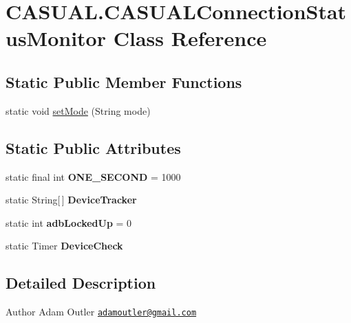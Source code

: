 \hypertarget{classCASUAL_1_1CASUALConnectionStatusMonitor}{\section{C\-A\-S\-U\-A\-L.\-C\-A\-S\-U\-A\-L\-Connection\-Status\-Monitor Class Reference}
\label{classCASUAL_1_1CASUALConnectionStatusMonitor}
}
\subsection*{Static Public Member Functions}
\begin{DoxyCompactItemize}
\item 
static void \hyperlink{classCASUAL_1_1CASUALConnectionStatusMonitor_a8b18170642eaa60caadf87c180a4b3c8}{set\-Mode} (String mode)
\end{DoxyCompactItemize}
\subsection*{Static Public Attributes}
\begin{DoxyCompactItemize}
\item 
\hypertarget{classCASUAL_1_1CASUALConnectionStatusMonitor_a90e99917eda2f6d4ac56313ebb3fd4c7}{static final int {\bfseries O\-N\-E\-\_\-\-S\-E\-C\-O\-N\-D} = 1000}\label{classCASUAL_1_1CASUALConnectionStatusMonitor_a90e99917eda2f6d4ac56313ebb3fd4c7}

\item 
\hypertarget{classCASUAL_1_1CASUALConnectionStatusMonitor_a1c9e576e98ffbd5cd92060fb3dbf69ac}{static String\mbox{[}$\,$\mbox{]} {\bfseries Device\-Tracker}}\label{classCASUAL_1_1CASUALConnectionStatusMonitor_a1c9e576e98ffbd5cd92060fb3dbf69ac}

\item 
\hypertarget{classCASUAL_1_1CASUALConnectionStatusMonitor_a65f45d24cba3f9eed0d1837798330c58}{static int {\bfseries adb\-Locked\-Up} = 0}\label{classCASUAL_1_1CASUALConnectionStatusMonitor_a65f45d24cba3f9eed0d1837798330c58}

\item 
static Timer {\bfseries Device\-Check}
\end{DoxyCompactItemize}


\subsection{Detailed Description}
\begin{DoxyAuthor}{Author}
Adam Outler \href{mailto:adamoutler@gmail.com}{\tt adamoutler@gmail.\-com} 
\end{DoxyAuthor}


